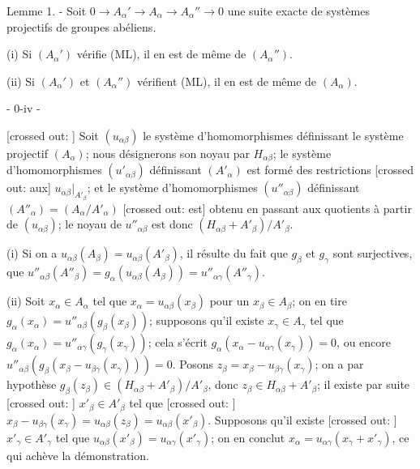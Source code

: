 Lemme 1. - Soit $0 \to A_{\alpha}' \to A_{\alpha} \to A_{\alpha}'' \to 0$ une suite exacte de systèmes projectifs de groupes abéliens.

(i) Si $(A_{\alpha}')$ vérifie (ML), il en est de même de $(A_{\alpha}'')$.

(ii) Si $(A_{\alpha}')$ et $(A_{\alpha}'')$ vérifient (ML), il en est de même de $(A_{\alpha})$.

\newpage


- 0-iv -

[crossed out: ] Soit $(u_{\alpha\beta})$ le système d'homomorphismes définissant le système projectif $(A_{\alpha})$; nous désignerons son noyau par $H_{\alpha\beta}$; le système d'homomorphismes $(u'_{\alpha\beta})$ définissant $(A'_{\alpha})$ est formé des restrictions [crossed out: aux] $u_{\alpha\beta}|_{A'_{\beta}}$; et le système d'homomorphismes $(u''_{\alpha\beta})$ définissant $(A''_{\alpha})=(A_{\alpha}/A'_{\alpha})$ [crossed out: est] obtenu en passant aux quotients à partir de $(u_{\alpha\beta})$; le noyau de $u''_{\alpha\beta}$ est donc $(H_{\alpha\beta}+A'_{\beta})/A'_{\beta}$.

(i) Si on a $u_{\alpha\beta}(A_{\beta})=u_{\alpha\beta}(A'_{\beta})$, il résulte du fait que $g_{\beta}$ et $g_{\gamma}$ sont surjectives, que $u''_{\alpha\beta}(A''_{\beta})=g_{\alpha}(u_{\alpha\beta}(A_{\beta}))=u''_{\alpha\gamma}(A''_{\gamma})$.

(ii) Soit $x_{\alpha} \in A_{\alpha}$ tel que $x_{\alpha}=u_{\alpha\beta}(x_{\beta})$ pour un $x_{\beta} \in A_{\beta}$; on en tire $g_{\alpha}(x_{\alpha})=u''_{\alpha\beta}(g_{\beta}(x_{\beta}))$; supposons qu'il existe $x_{\gamma} \in A_{\gamma}$ tel que $g_{\alpha}(x_{\alpha})=u''_{\alpha\gamma}(g_{\gamma}(x_{\gamma}))$; cela s'écrit $g_{\alpha}(x_{\alpha}-u_{\alpha\gamma}(x_{\gamma}))=0$, ou encore $u''_{\alpha\beta}(g_{\beta}(x_{\beta}-u_{\beta\gamma}(x_{\gamma})))=0$. Posons $z_{\beta}=x_{\beta}-u_{\beta\gamma}(x_{\gamma})$; on a par hypothèse $g_{\beta}(z_{\beta}) \in (H_{\alpha\beta}+A'_{\beta})/A'_{\beta}$, donc $z_{\beta} \in H_{\alpha\beta}+A'_{\beta}$; il existe par suite [crossed out: ] $x'_{\beta} \in A'_{\beta}$ tel que [crossed out: ] $x_{\beta}-u_{\beta\gamma}(x_{\gamma})=u_{\alpha\beta}(z_{\beta})=u_{\alpha\beta}(x'_{\beta})$. Supposons qu'il existe [crossed out: ] $x'_{\gamma} \in A'_{\gamma}$ tel que $u_{\alpha\beta}(x'_{\beta})=u_{\alpha\gamma}(x'_{\gamma})$; on en conclut $x_{\alpha}=u_{\alpha\gamma}(x_{\gamma}+x'_{\gamma})$, ce qui achève la démonstration.

